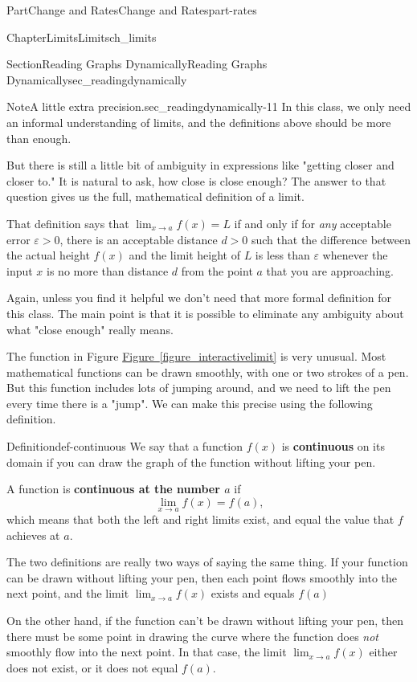 \documentclass[oneside,10pt,]{tufte-book}
\newcommand{\xreffont}{\relax}
\newcommand{\terminology}[1]{\textbf{#1}}
\numberwithin{equation}{chapter}
\begin{document}
\begin{partptx}{Part}{Change and Rates}{}{Change and Rates}{}{}{part-rates}
\begin{chapterptx}{Chapter}{Limits}{}{Limits}{}{}{ch_limits}
\begin{sectionptx}{Section}{Reading Graphs Dynamically}{}{Reading Graphs Dynamically}{}{}{sec_readingdynamically}
\begin{note}{Note}{A little extra precision.}{sec_readingdynamically-11}
In this class, we only need an informal understanding of limits, and the definitions above should be more than enough.%
\par
But there is still a little bit of ambiguity in expressions like "getting closer and closer to."  It is natural to ask, how close is close enough? The answer to that question gives us the full, mathematical definition of a limit.%
\par
That definition says that \(\lim_{x\rightarrow a}f(x) = L\) if and only if for \emph{any} acceptable error \(\varepsilon>0\), there is an acceptable distance \(d>0\) such that the difference between the actual height \(f(x)\) and the limit height of \(L\) is less than \(\varepsilon\) whenever the input \(x\) is no more than distance \(d\) from the point \(a\) that you are approaching.%
\par
Again, unless you find it helpful we don't need that more formal definition for this class.  The main point is that it is possible to eliminate any ambiguity about what "close enough" really means.%
\end{note}
The function in Figure \hyperref[figure_interactivelimit]{Figure~{\xreffont\ref{figure_interactivelimit}}} is very unusual. Most mathematical functions can be drawn smoothly, with one or two strokes of a pen. But this function includes lots of jumping around, and we need to lift the pen every time there is a "jump". We can make this precise using the following definition.%
\begin{definition}{Definition}{}{def-continuous}%
We say that a function \(f(x)\) is \terminology{continuous} on its domain if you can draw the graph of the function without lifting your pen.%
\par
A function is \terminology{continuous at the number \(a\)} if%
\begin{equation*}
\lim_{x\rightarrow a} f(x) = f(a)\text{,}
\end{equation*}
which means that both the left and right limits exist, and equal the value that \(f\) achieves at \(a\).%
\end{definition}
The two definitions are really two ways of saying the same thing. If your function can be drawn without lifting your pen, then each point flows smoothly into the next point, and the limit \(\lim_{x\rightarrow a} f(x) \) exists and equals \(f(a)\)%
\par
On the other hand, if the function can't be drawn without lifting your pen, then there must be some point in drawing the curve where the function does \emph{not} smoothly flow into the next point.  In that case, the limit \(\lim_{x\rightarrow a}f(x)\) either does not exist, or it does not equal \(f(a)\).%

\end{sectionptx}
\end{chapterptx}
\end{partptx}
\end{document}
